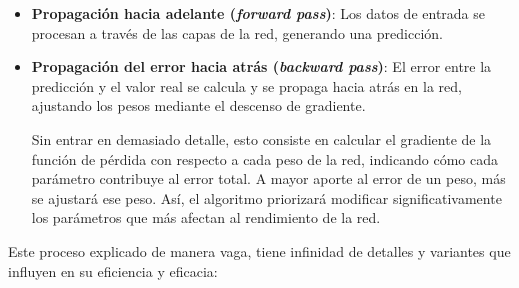 \begin{itemize}

    \item \textbf{Propagación hacia adelante (\textit{forward pass})}: Los datos de entrada se procesan a 
    través de las capas de la red, generando una predicción. 

    \item \textbf{Propagación del error hacia atrás (\textit{backward pass})}: El error entre la 
    predicción y el valor real se calcula y se propaga hacia atrás en la red, ajustando los pesos mediante el 
    descenso de gradiente.
    
    Sin entrar en demasiado detalle, esto consiste en calcular el gradiente de la función de pérdida con           %
    respecto a cada peso de la red, indicando cómo cada parámetro contribuye al error total. 
    A mayor aporte al error de un peso, más se ajustará ese peso. Así, el algoritmo priorizará modificar 
    significativamente los parámetros que más afectan al rendimiento de la red.
    
\end{itemize}

Este proceso explicado de manera vaga, tiene infinidad de detalles y variantes que influyen en su eficiencia y
eficacia:

